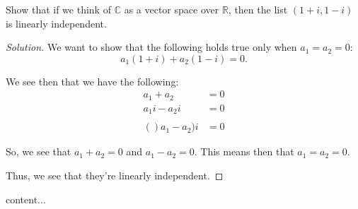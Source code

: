 \documentclass[openany]{book}
\newenvironment{solution}{\begin{proof}[Solution]}{\end{proof}}
\newcommand{\CC}{\mathbb{C}}
\newcommand{\RR}{\mathbb{R}}
\begin{document}
\begin{hw}
	Show that if we think of $\CC$ as a vector space over $\RR$, then the list $(1+i, 1-i)$ is linearly independent.
\end{hw}
\begin{solution}
	We want to show that the following holds true only when $a_{1} = a_{2} = 0$:
	\begin{equation*}
		a_{1}(1+i) + a_{2}(1-i) = 0.
	\end{equation*}

	We see then that we have the following:
	\begin{align*}
		a_{1} + a_{2} &= 0 \\
		a_{1}i - a_{2}i &= 0 \\
		\\
		()a_{1}-a_{2})i &= 0
	\end{align*}

	So, we see that $a_{1} + a_{2} = 0$ and $a_{1} - a_{2} = 0$. This means then that $a_{1} = a_{2} = 0$.
	
	Thus, we see that they're linearly independent.
\end{solution}

\begin{hw}
	content...
\end{hw}
\end{document}
